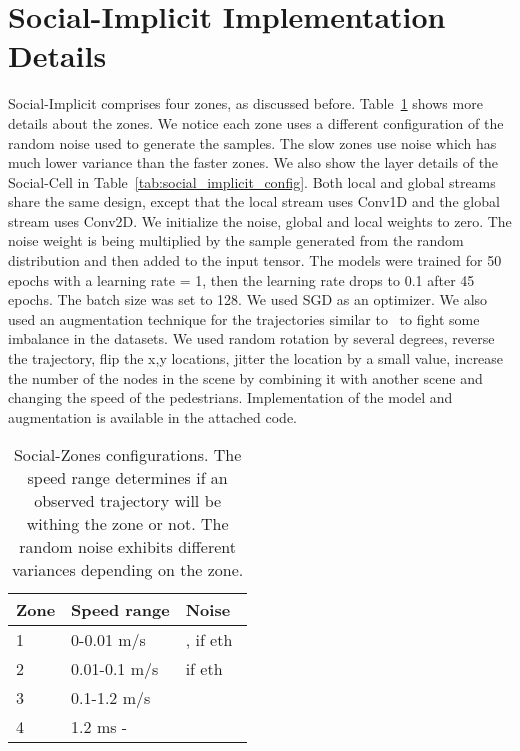 \documentclass[runningheads]{llncs}
\begin{document}
\section{Social-Implicit Implementation Details}
Social-Implicit comprises four zones, as discussed before. Table~\ref{tab:social_implicit_zones} shows more details about the zones. We notice each zone uses a different configuration of the random noise used to generate the samples. The slow zones use noise which has much lower variance than the faster zones. We also show the layer details of the Social-Cell in Table~\ref{tab:social_implicit_config}. Both local and global streams share the same design, except that the local stream uses Conv1D and the global stream uses Conv2D. We initialize the noise, global and local weights to zero. The noise weight is being multiplied by the sample generated from the random distribution and then added to the input tensor. The models were trained for 50 epochs with a learning rate  = 1, then the learning rate drops to 0.1 after 45 epochs. The batch size was set to 128. We used SGD as an optimizer. We also used an augmentation technique for the trajectories similar to~\cite{salzmann2020trajectron++} to fight some imbalance in the datasets. We used random rotation by several degrees, reverse the trajectory, flip the x,y locations, jitter the location by a small value, increase the number of the nodes in the scene by combining it with another scene and changing the speed of the pedestrians. Implementation of the model and augmentation is available in the attached code.

\begin{table}[ht]
\centering
\small
\begin{tabular}{|l|l|l|} 
\hline
Zone & Speed range & Noise~                  \\ 
\hline
1    & 0-0.01 m/s               & , if eth  \\
2    & 0.01-0.1 m/s             &  if eth             \\
3    & 0.1-1.2 m/s              &                         \\
4    & 1.2 ms -~                &                    \\
\hline
\end{tabular}
\caption{Social-Zones configurations. The speed range determines if an observed trajectory will be withing the zone or not. The random noise exhibits different variances depending on the zone.}
\label{tab:social_implicit_zones}
\end{table}
\end{document}
